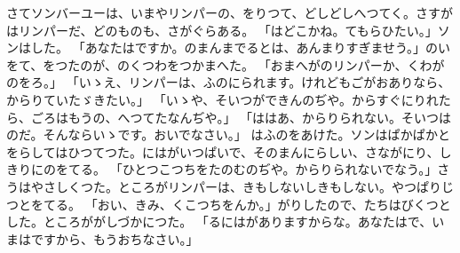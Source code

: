 \documentclass[a4paper,
tate,
book]
{jlreq}
\begin{document}
  さてソンバーユーは、いまやリンパーの、をりつて、どしどしへつてく。さすがはリンパーだ、どのものも、さがぐらある。
「はどこかね。てもらひたい。」ソンはした。
「あなたはですか。のまんまでるとは、あんまりすぎませう。」のいをて、をつたのが、のくつわをつかまへた。
「おまへがのリンパーか、くわがのをろ。」
「いゝえ、リンパーは、ふのにられます。けれどもごがおありなら、からりていたゞきたい。」
「いゝや、そいつができんのぢや。からすぐにりれたら、ごろはもうの、へつてたなんぢや。」
「ははあ、からりられない。そいつはのだ。そんならいゝです。おいでなさい。」
  はふのをあけた。ソンはぱかぱかとをらしてはひつてつた。にはがいつぱいで、そのまんにらしい、さながにり、しきりにのをてる。
「ひとつこつちをたのむのぢや。からりられないでなう。」さうはやさしくつた。ところがリンパーは、きもしないしきもしない。やつぱりじつとをてる。
「おい、きみ、くこつちをんか。」がりしたので、たちはびくつとした。ところががしづかにつた。
「るにはがありますからな。あなたはで、いまはですから、もうおちなさい。」
\end{document}
